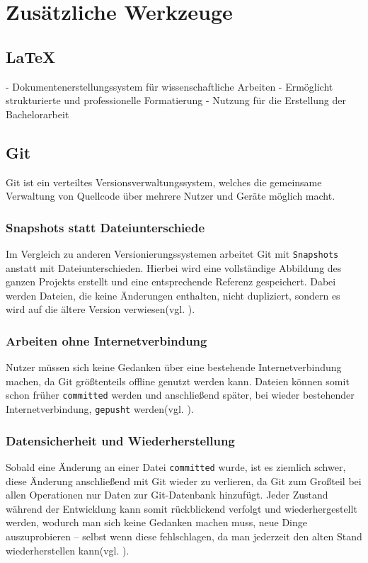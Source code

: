 \documentclass[oneside]{ausarbeitung}
\begin{document}
\section{Zusätzliche Werkzeuge}

\subsection{LaTeX}
- Dokumentenerstellungssystem für wissenschaftliche Arbeiten  
- Ermöglicht strukturierte und professionelle Formatierung  
- Nutzung für die Erstellung der Bachelorarbeit  

\subsection{Git}

Git ist ein verteiltes Versionsverwaltungssystem, welches die gemeinsame Verwaltung von Quellcode über mehrere Nutzer und Geräte möglich macht.  

\subsubsection{Snapshots statt Dateiunterschiede}
Im Vergleich zu anderen Versionierungssystemen arbeitet Git mit \texttt{Snapshots} anstatt mit Dateiunterschieden. Hierbei wird eine vollständige Abbildung des ganzen Projekts erstellt und eine entsprechende Referenz gespeichert. Dabei werden Dateien, die keine Änderungen enthalten, nicht dupliziert, sondern es wird auf die ältere Version verwiesen(vgl. \parencite{git_intro}).  

\subsubsection{Arbeiten ohne Internetverbindung}
Nutzer müssen sich keine Gedanken über eine bestehende Internetverbindung machen, da Git größtenteils offline genutzt werden kann. Dateien können somit schon früher \texttt{committed} werden und anschließend später, bei wieder bestehender Internetverbindung, \texttt{gepusht} werden(vgl. \parencite{git_intro}).  

\subsubsection{Datensicherheit und Wiederherstellung}
Sobald eine Änderung an einer Datei \texttt{committed} wurde, ist es ziemlich schwer, diese Änderung anschließend mit Git wieder zu verlieren, da Git zum Großteil bei allen Operationen nur Daten zur Git-Datenbank hinzufügt. Jeder Zustand während der Entwicklung kann somit rückblickend verfolgt und wiederhergestellt werden, wodurch man sich keine Gedanken machen muss, neue Dinge auszuprobieren – selbst wenn diese fehlschlagen, da man jederzeit den alten Stand wiederherstellen kann(vgl. \parencite{git_intro}).  
\end{document}
